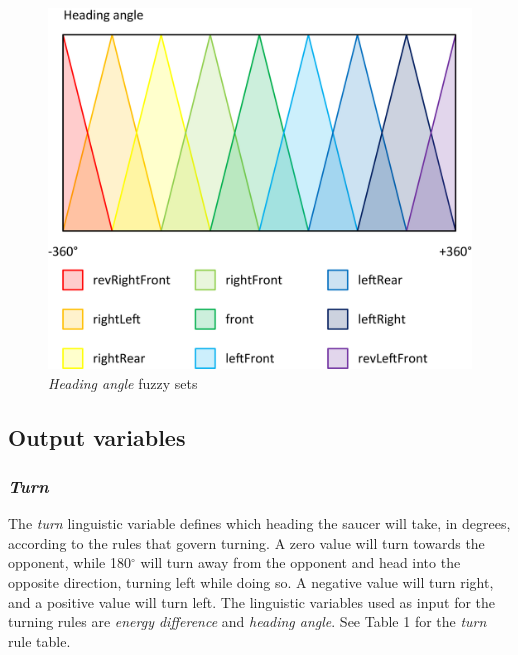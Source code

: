 \begin{figure}[H]
\centering
\caption{\emph{Heading angle} fuzzy sets}
\includegraphics[scale=0.1]{./img/pdf/headingAngleSets.pdf}
\end{figure}

\subsection{Output variables}

\subsubsection{\emph{Turn}}

The \emph{turn} linguistic variable defines which heading the saucer will take, in degrees, according to the rules that govern turning. A zero value will turn towards the opponent, while 180$^{\circ}$ will turn away from the opponent and head into the opposite direction, turning left while doing so. A negative value will turn right, and a positive value will turn left. The linguistic variables used as input for the turning rules are \emph{energy difference} and \emph{heading angle}. See Table 1 for the \emph{turn} rule table.

